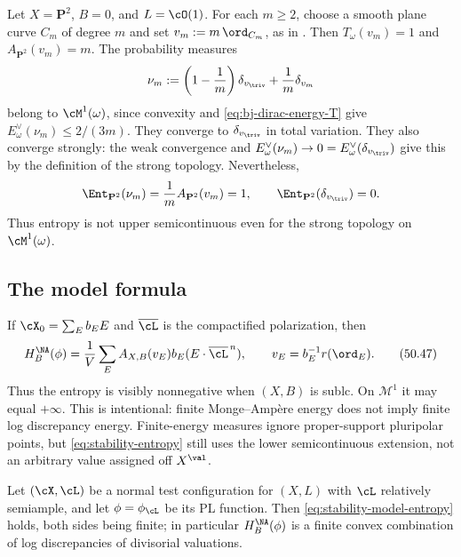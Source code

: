 \begin{example}
\label{ex:ch50-entropy-jumps}
Let $X=\mathbf P^2$, $B=0$, and $L=\cO(1)$.  For each $m\ge2$,
choose a smooth plane curve $C_m$ of degree $m$ and set
$v_m:=m\,\ord_{C_m}$, as in .  Then
$T_\omega(v_m)=1$ and $A_{\mathbf P^2}(v_m)=m$.  The probability
measures
\[
 \nu_m:=\left(1-\frac1m\right)\delta_{v_{\triv}}
          +\frac1m\delta_{v_m}
\]
belong to $\cM^1(\omega)$, since convexity and
\eqref{eq:bj-dirac-energy-T} give
$E^\vee_\omega(\nu_m)\le2/(3m)$.  They converge to
$\delta_{v_{\triv}}$ in total variation.  They also converge strongly:
the weak convergence and $E^\vee_\omega(\nu_m)\to0
=E^\vee_\omega(\delta_{v_{\triv}})$ give this by the definition of the
strong topology.  Nevertheless,
\[
 \Ent_{\mathbf P^2}(\nu_m)=\frac1mA_{\mathbf P^2}(v_m)=1,
 \qquad
 \Ent_{\mathbf P^2}(\delta_{v_{\triv}})=0.
\]
Thus entropy is not upper semicontinuous even for the strong topology
on $\cM^1(\omega)$.
\end{example}

\subsection{The model formula}
\label{sec:ch50-model-entropy}

If $\cX_0=\sum_Eb_EE$ and $\overline\cL$ is the compactified
polarization, then
\[
 H^{\NA}_B(\phi)
 =\frac1V\sum_E
     A_{X,B}(v_E)b_E(E\cdot\overline\cL^{\,n}),
\qquad
 v_E=b_E^{-1}r(\ord_E).
\tag{50.47}\label{eq:stability-model-entropy}
\]
Thus the entropy is visibly nonnegative when $(X,B)$ is sublc.
On $\mathcal M^1$ it may equal $+\infty$.  This is intentional: finite
Monge--Amp\`ere energy does not imply finite log discrepancy energy.
Finite-energy measures ignore proper-support pluripolar points, but
\eqref{eq:stability-entropy} still uses the lower semicontinuous extension,
not an arbitrary value assigned off $X^{\val}$.

\begin{proposition}
\label{prop:ch50-model-entropy}
Let $(\cX,\cL)$ be a normal test configuration for $(X,L)$ with
$\cL$ relatively semiample, and let $\phi=\phi_\cL$ be its PL
function.  Then \eqref{eq:stability-model-entropy} holds, both sides being
finite; in particular $H_B^{\NA}(\phi)$ is a finite convex combination of
log discrepancies of divisorial valuations.
\end{proposition}

